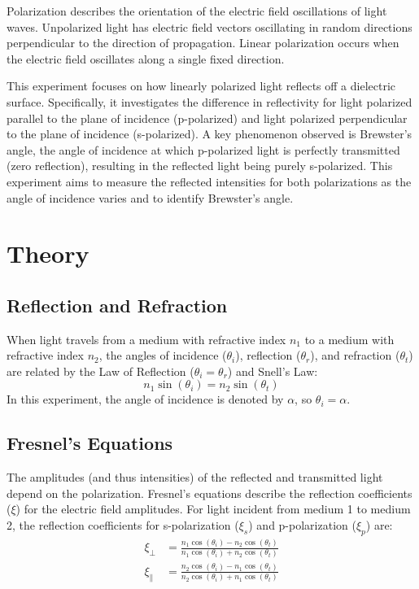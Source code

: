 \documentclass[journal]{IEEEtran}
\begin{document}
Polarization describes the orientation of the electric field oscillations of light waves. Unpolarized light has electric field vectors oscillating in random directions perpendicular to the direction of propagation. Linear polarization occurs when the electric field oscillates along a single fixed direction.

This experiment focuses on how linearly polarized light reflects off a dielectric surface. Specifically, it investigates the difference in reflectivity for light polarized parallel to the plane of incidence (p-polarized) and light polarized perpendicular to the plane of incidence (s-polarized). A key phenomenon observed is Brewster's angle, the angle of incidence at which p-polarized light is perfectly transmitted (zero reflection), resulting in the reflected light being purely s-polarized. This experiment aims to measure the reflected intensities for both polarizations as the angle of incidence varies and to identify Brewster's angle.
\section{Theory}
\subsection{Reflection and Refraction}
When light travels from a medium with refractive index $n_1$ to a medium with refractive index $n_2$, the angles of incidence ($\theta_i$), reflection ($\theta_r$), and refraction ($\theta_t$) are related by the Law of Reflection ($\theta_i = \theta_r$) and Snell's Law:
\begin{equation}
    n_1 \sin(\theta_i) = n_2 \sin(\theta_t)
\end{equation}
In this experiment, the angle of incidence is denoted by $\alpha$, so $\theta_i = \alpha$.

\subsection{Fresnel's Equations}
The amplitudes (and thus intensities) of the reflected and transmitted light depend on the polarization. Fresnel's equations describe the reflection coefficients ($\xi$) for the electric field amplitudes. For light incident from medium 1 to medium 2, the reflection coefficients for s-polarization ($\xi_s$) and p-polarization ($\xi_p$) are:
\begin{align}
    \xi_{\perp} &= \frac{n_1 \cos(\theta_i) - n_2 \cos(\theta_t)}{n_1 \cos(\theta_i) + n_2 \cos(\theta_t)} \\
    \xi_{\parallel} &= \frac{n_2 \cos(\theta_i) - n_1 \cos(\theta_t)}{n_2 \cos(\theta_i) + n_1 \cos(\theta_t)}
\end{align}
\end{document}
